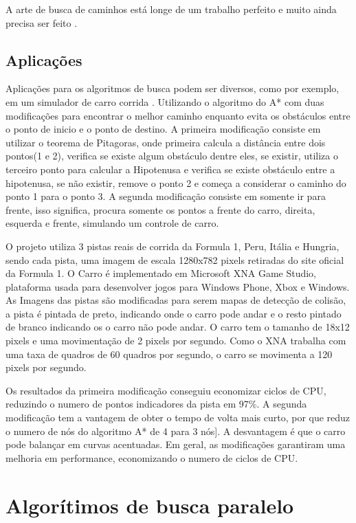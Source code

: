 A arte de busca de caminhos está longe de um trabalho perfeito e muito ainda precisa ser feito \cite{Pontevia}.

\subsection{Aplicações}
Aplicações para os algoritmos de busca podem ser diversos, como por exemplo, em um simulador de carro corrida \cite{JungTing}. Utilizando o algoritmo do A* com duas modificações para encontrar o melhor caminho enquanto evita os obstáculos entre o ponto de inicio e o ponto de destino. 
A primeira modificação consiste em utilizar o teorema de Pitagoras, onde primeira calcula a distância entre dois pontos(1 e 2), verifica se existe algum obstáculo dentre eles, se existir, utiliza o terceiro ponto para calcular a Hipotenusa e verifica se existe obstáculo entre a hipotenusa, se não existir, remove o ponto 2 e começa a considerar o caminho do ponto 1 para o ponto 3. A segunda modificação consiste em somente ir para frente, isso significa, procura somente os pontos a frente do carro, direita, esquerda e frente, simulando um controle de carro.

O projeto utiliza 3 pistas reais de corrida da Formula 1, Peru, Itália e Hungria, sendo cada pista, uma imagem de escala 1280x782 pixels retiradas do site oficial da Formula 1. O Carro é implementado em Microsoft XNA Game Studio, plataforma usada para desenvolver jogos para Windows Phone, Xbox e Windows. As Imagens das pistas são modificadas para serem mapas de detecção de colisão, a pista é pintada de preto, indicando onde o carro pode andar e o resto pintado de branco indicando os o carro não pode andar. O carro tem o tamanho de 18x12 pixels e uma movimentação de 2 pixels por segundo. Como o XNA trabalha com uma taxa de quadros de 60 quadros por segundo, o carro se movimenta a 120 pixels por segundo.

Os resultados da primeira modificação conseguiu economizar ciclos de CPU, reduzindo o numero de pontos indicadores da pista em 97\%. A segunda modificação tem a vantagem de obter o tempo de volta mais curto, por que reduz o numero de nós do algoritmo A* de 4 para 3 nós]. A desvantagem é que o carro pode balançar em curvas acentuadas. Em geral, as modificações garantiram uma melhoria em performance, economizando o numero de ciclos de CPU.


\section{Algorítimos de busca paralelo}

